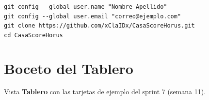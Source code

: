 \documentclass[11pt,a4paper]{article}
\begin{document}
\begin{lstlisting}
git config --global user.name "Nombre Apellido"
git config --global user.email "correo@ejemplo.com"
git clone https://github.com/xClaIDx/CasaScoreHorus.git
cd CasaScoreHorus
\end{lstlisting}

\section{Boceto del Tablero}
Vista \textbf{Tablero} con las tarjetas de ejemplo del sprint 7 (semana 11).

\vspace{0.15cm}
\newcommand{\tarjeta}[9]{%
  \draw[gray!50, fill=white, rounded corners=2pt] (#1+0.08,#2) rectangle (#1+3.02,#2-1.05);
  \node[anchor=north west, inner sep=0pt, font=\fontsize{4.5}{5}\selectfont, text=GrisOscuro] at (#1+0.18,#2-0.1) {\##3};
  \node[anchor=north west, inner sep=0pt, text width=2.4cm, font=\fontsize{5.5}{6.2}\selectfont\bfseries] at (#1+0.18,#2-0.3) {#4};
  \node[anchor=west, fill=#5, text=white, rounded corners=1pt, inner sep=1.3pt, font=\fontsize{4.5}{5}\selectfont\bfseries] (tt) at (#1+0.18,#2-0.88) {#6};
  \node[anchor=west, fill=gray!55, text=white, rounded corners=1pt, inner sep=1.3pt, font=\fontsize{4.5}{5}\selectfont\bfseries] at ([xshift=2pt]tt.east) {EDT #7};
  \node[anchor=east, inner sep=0pt, font=\fontsize{4.5}{5}\selectfont, text=GrisOscuro] at (#1+2.62,#2-0.2) {#9};
  \fill[AzulUNA!85] (#1+2.82,#2-0.2) circle (0.13);
  \node[text=white, inner sep=0pt, font=\fontsize{4.2}{5}\selectfont\bfseries] at (#1+2.82,#2-0.2) {#8};}
\end{document}
